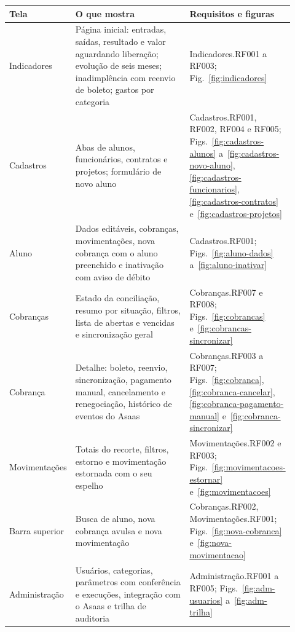 \documentclass[11pt,a4paper,oneside]{report}
\begin{document}
\begin{longtable}{@{}p{0.2\linewidth} p{0.46\linewidth} >{\raggedright\arraybackslash}p{0.26\linewidth}@{}}
  \toprule
  \textbf{Tela} & \textbf{O que mostra} & \textbf{Requisitos e figuras} \\
  \midrule
  \endhead
  Indicadores & Página inicial: entradas, saídas, resultado e valor aguardando liberação; evolução
                de seis meses; inadimplência com reenvio de boleto; gastos por categoria &
                Indicadores.RF001 a RF003; Fig.~\ref{fig:indicadores} \\
  Cadastros & Abas de alunos, funcionários, contratos e projetos; formulário de novo aluno &
              Cadastros.RF001, RF002, RF004 e RF005; Figs.~\ref{fig:cadastros-alunos}
              a~\ref{fig:cadastros-novo-aluno}, \ref{fig:cadastros-funcionarios},
              \ref{fig:cadastros-contratos} e~\ref{fig:cadastros-projetos} \\
  Aluno & Dados editáveis, cobranças, movimentações, nova cobrança com o aluno preenchido e
          inativação com aviso de débito & Cadastros.RF001; Figs.~\ref{fig:aluno-dados}
          a~\ref{fig:aluno-inativar} \\
  Cobranças & Estado da conciliação, resumo por situação, filtros, lista de abertas e vencidas e
              sincronização geral & Cobranças.RF007 e RF008; Figs.~\ref{fig:cobrancas}
              e~\ref{fig:cobrancas-sincronizar} \\
  Cobrança & Detalhe: boleto, reenvio, sincronização, pagamento manual, cancelamento e
             renegociação, histórico de eventos do Asaas & Cobranças.RF003 a RF007;
             Figs.~\ref{fig:cobranca}, \ref{fig:cobranca-cancelar},
             \ref{fig:cobranca-pagamento-manual} e~\ref{fig:cobranca-sincronizar} \\
  Movimentações & Totais do recorte, filtros, estorno e movimentação estornada com o seu espelho &
                  Movimentações.RF002 e RF003; Figs.~\ref{fig:movimentacoes-estornar}
                  e~\ref{fig:movimentacoes} \\
  Barra superior & Busca de aluno, nova cobrança avulsa e nova movimentação & Cobranças.RF002,
                   Movimentações.RF001; Figs.~\ref{fig:nova-cobranca}
                   e~\ref{fig:nova-movimentacao} \\
  Administração & Usuários, categorias, parâmetros com conferência e execuções, integração com o
                  Asaas e trilha de auditoria & Administração.RF001 a RF005;
                  Figs.~\ref{fig:adm-usuarios} a~\ref{fig:adm-trilha} \\
  \bottomrule
\end{longtable}
\end{document}
